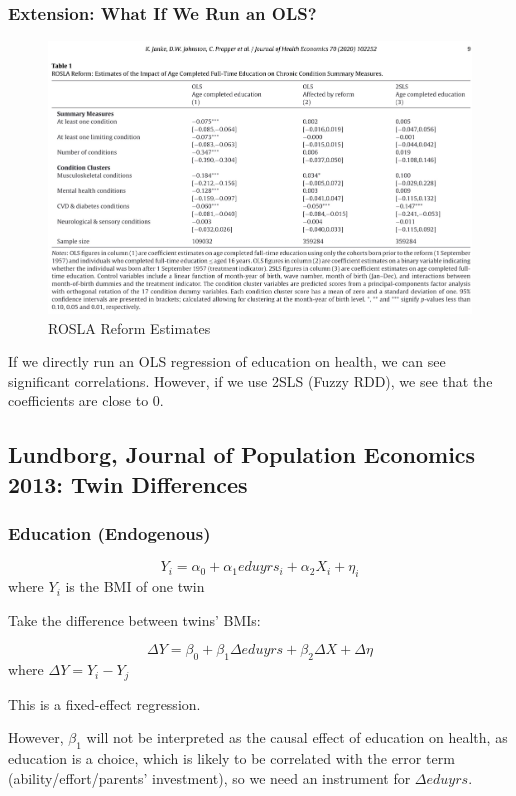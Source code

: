         \subsubsection{Extension: What If We Run an OLS?}
            \begin{figure}[H]
                \centering
                \includegraphics[width=5in]{images/ch3/40.png}
                \caption{ROSLA Reform Estimates}
            \end{figure}        
            If we directly run an OLS regression of education on health, we can see significant correlations. However, if we use 2SLS (Fuzzy RDD), we see that the coefficients are close to 0.

    \subsection{Lundborg, Journal of Population Economics 2013: Twin Differences}\label{lundborg_twin_diff}
        
        \subsubsection{Education (Endogenous)}
            $$Y_i = \alpha_0+\alpha_1 eduyrs_i+\alpha_2 X_i+\eta_i$$
                    where  $Y_i$ is the BMI of one twin
            
            Take the difference between twins' BMIs:
            
            $$\Delta Y = \beta_0+\beta_1\Delta eduyrs+\beta_2 \Delta X+\Delta \eta$$
            where  $\Delta Y=Y_i-Y_j$ 
            
            This is a fixed-effect regression.
            
            However, $\beta_1$ will not be interpreted as the causal effect of education on health, as education is a choice, which is likely to be correlated with the error term (ability/effort/parents' investment), so we need an instrument for $\Delta eduyrs$.
        
